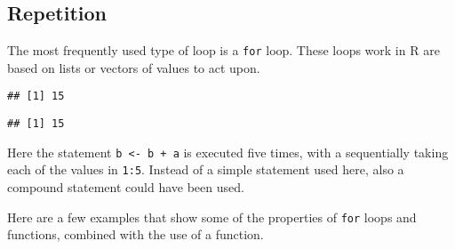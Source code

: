 \documentclass[paper=a4,headsepline,BCOR=12mm,twoside,open=right,%
titlepage,headings=small,fontsize=10pt,index=totoc,bibliography=totoc,%
captions=tableheading,captions=nooneline]{scrbook}\usepackage{knitr}
\begin{document}
\subsection{Repetition}

The most frequently used type of loop is a \texttt{for} loop. These loops work in R are based on lists or vectors of values to act upon.

\begin{knitrout}\footnotesize
{}\color{fgcolor}\begin{kframe}
\begin{alltt}
 \hlkwb{<-} 
   \hlopt{:} \hlkwb{<-}  \hlopt{+} 
\end{alltt}
\begin{verbatim}
## [1] 15
\end{verbatim}
\begin{alltt}
 \hlkwb{<-} \hlstd{(}\hlopt{:}\hlstd{)} 
\end{alltt}
\begin{verbatim}
## [1] 15
\end{verbatim}
\end{kframe}
\end{knitrout}

Here the statement \texttt{b <- b + a} is executed five times, with a sequentially taking each of the values in \texttt{1:5}. Instead of a simple statement used here, also a compound statement could have been used.

Here are a few examples that show some of the properties of \texttt{for} loops and functions, combined with the use of a function.
\end{document}

